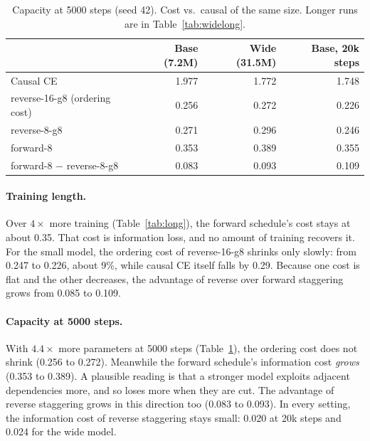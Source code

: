 \documentclass[11pt]{article}
\theoremstyle{definition}
\theoremstyle{remark}
\newcommand{\sch}[1]{\textsf{#1}}
\begin{document}
\begin{table}[t]
  \centering
  \caption{Capacity at 5000 steps (seed 42). Cost vs.\ causal of the same size. Longer runs are in Table~\ref{tab:widelong}.}
  \label{tab:wide}
  \small
  \begin{tabular}{lrrr}
    \toprule
     & Base (7.2M) & Wide (31.5M) & Base, 20k steps \\
    \midrule
    Causal CE                          & 1.977 & 1.772 & 1.748 \\
    \sch{reverse-16-g8} (ordering cost) & 0.256 & 0.272 & 0.226 \\
    \sch{reverse-8-g8}                  & 0.271 & 0.296 & 0.246 \\
    \sch{forward-8}                     & 0.353 & 0.389 & 0.355 \\
    \sch{forward-8} $-$ \sch{reverse-8-g8} & 0.083 & 0.093 & 0.109 \\
    \bottomrule
  \end{tabular}
\end{table}

\paragraph{Training length.}
Over $4\times$ more training (Table~\ref{tab:long}), the forward schedule's cost stays at about 0.35.
That cost is information loss, and no amount of training recovers it.
For the small model, the ordering cost of \sch{reverse-16-g8} shrinks only slowly: from 0.247 to 0.226, about 9\%, while causal CE itself falls by 0.29.
Because one cost is flat and the other decreases, the advantage of reverse over forward staggering grows from 0.085 to 0.109.

\paragraph{Capacity at 5000 steps.}
With $4.4\times$ more parameters at 5000 steps (Table~\ref{tab:wide}), the ordering cost does not shrink (0.256 to 0.272).
Meanwhile the forward schedule's information cost \emph{grows} (0.353 to 0.389).
A plausible reading is that a stronger model exploits adjacent dependencies more, and so loses more when they are cut.
The advantage of reverse staggering grows in this direction too (0.083 to 0.093).
In every setting, the information cost of reverse staggering stays small: 0.020 at 20k steps and 0.024 for the wide model.
\end{document}
